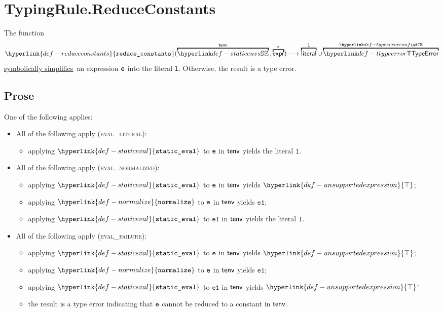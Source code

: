 \documentclass{book}
\newcommand\ProseOrTypeError[0]{\ProseTerminateAs{\TypeErrorConfig}}
\newcommand\staticeval[0]{\hyperlink{def-staticeval}{\texttt{static\_eval}}}
\newcommand\normalize[0]{\hyperlink{def-normalize}{\texttt{normalize}}}
\newcommand\CannotBeTransformed[0]{\hyperlink{def-unsupportedexpression}{\top}}
\newcommand\symbolicallysimplifies[0]{\hyperlink{def-symbolicallysimplifies}{symbolically simplifies}}
\newcommand\reduceconstants[0]{\hyperlink{def-reduceconstants}{\texttt{reduce\_constants}}}
\newcommand\vl[0]{\texttt{l}}
\newcommand\veone[0]{\texttt{e1}}
\begin{document}
\section{TypingRule.ReduceConstants \label{sec:TypingRule.ReduceConstants}}
\hypertarget{def-reduceconstants}{}
The function
\[
\reduceconstants(\overname{\staticenvs}{\tenv} \aslsep \overname{\expr}{\ve})
\aslto
\overname{\literal}{\vl} \cup \overname{\TTypeError}{\TypeErrorConfig}
\]
\symbolicallysimplifies\ an expression $\texttt{e}$ into the literal $\vl$.
Otherwise, the result is a type error.

\subsection{Prose}
One of the following applies:
\begin{itemize}
  \item All of the following apply (\textsc{eval\_literal}):
  \begin{itemize}
    \item applying $\staticeval$ to $\texttt{e}$ in $\textsf{tenv}$ yields the literal $\vl$\ProseOrTypeError.
  \end{itemize}

  \item All of the following apply (\textsc{eval\_normalized}):
  \begin{itemize}
    \item applying $\staticeval$ to $\texttt{e}$ in $\textsf{tenv}$ yields $\CannotBeTransformed$;
    \item applying $\normalize$ to $\texttt{e}$ in $\textsf{tenv}$ yields $\veone$\ProseOrTypeError;
    \item applying $\staticeval$ to $\veone$ in $\textsf{tenv}$ yields the literal $\vl$\ProseOrTypeError.
  \end{itemize}

  \item All of the following apply (\textsc{eval\_failure}):
  \begin{itemize}
    \item applying $\staticeval$ to $\texttt{e}$ in $\textsf{tenv}$ yields $\CannotBeTransformed$;
    \item applying $\normalize$ to $\texttt{e}$ in $\textsf{tenv}$ yields $\veone$\ProseOrTypeError;
    \item applying $\staticeval$ to $\veone$ in $\textsf{tenv}$ yields $\CannotBeTransformed$'
    \item the result is a type error indicating that $\texttt{e}$ cannot be reduced to a constant in $\textsf{tenv}$.
  \end{itemize}
\end{itemize}
\end{document}
